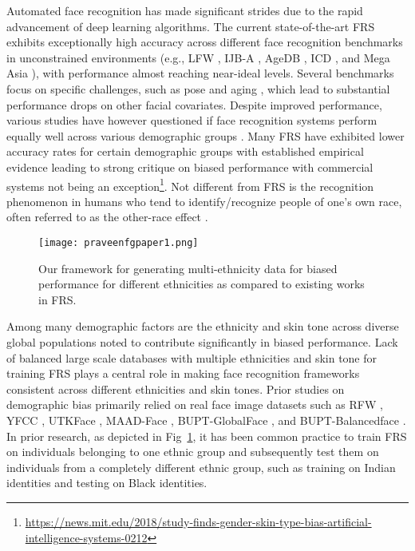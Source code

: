 {Automated face recognition has made significant strides due to the rapid advancement of deep learning algorithms. The current state-of-the-art FRS \cite{PFE2019,Boutros_2022_CVPR} exhibits exceptionally high accuracy across different face recognition benchmarks in unconstrained environments (e.g., LFW \cite{LFWTech}, IJB-A \cite{IJBA2015}, AgeDB \cite{agedb}, ICD \cite{ICD2022}, and Mega Asia \cite{SSRNet2018}), with performance almost reaching near-ideal levels.  Several benchmarks focus on specific challenges, such as pose and aging \cite{Longitudinal2023}, which lead to substantial performance drops on other facial covariates. Despite improved performance, various studies have however questioned if face recognition systems perform equally well across various demographic groups \cite{DeBiasing2020}. Many FRS have exhibited lower accuracy rates for certain demographic groups with established empirical evidence leading to strong critique on biased performance \cite{DeBiasing2020} with commercial systems not being an exception\footnote{\url{https://news.mit.edu/2018/study-finds-gender-skin-type-bias-artificial-intelligence-systems-0212}}. Not different from FRS is the recognition phenomenon in humans who tend to 
identify/recognize people of one's own race, often referred to as the other-race effect \cite{Klare2012, Demographics2023}.


\begin{figure}
		\centering
		\texttt{[image: praveenfgpaper1.png]}
		\caption{Our framework for generating multi-ethnicity data for biased performance for different ethnicities as compared to existing works in FRS.}
		\label{fig:framework-proposed}
\end{figure}

 
Among many demographic factors are the ethnicity and skin tone across diverse global populations noted to contribute significantly in biased performance. Lack of balanced large scale databases with multiple ethnicities and skin tone for training FRS plays a central role in making face recognition frameworks consistent across different ethnicities and skin tones. Prior studies on demographic bias primarily relied on real face image datasets such as RFW \cite{Wang_2019_ICCV}, YFCC \cite{YFCC100M}, UTKFace \cite{SCDAE2020}, MAAD-Face \cite{MAADFace2021}, BUPT-GlobalFace \cite{BUPTDataset}, and BUPT-Balancedface \cite{BUPTDataset}. In prior research, as depicted in Fig~\ref{fig:framework-proposed}, it has been common practice to train FRS on individuals belonging to one ethnic group and subsequently test them on individuals from a completely different ethnic group, such as training on Indian identities and testing on Black identities. 

}
